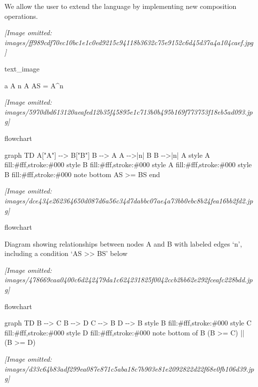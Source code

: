 \documentclass[
]{article}
\newenvironment{Shaded}{}{}
\newcommand{\NormalTok}[1]{#1}
\begin{document}
We allow the user to extend the language by implementing new composition
operations.

\textit{[Image omitted: images/ff989cdf70ec10bc1e1c0ed9215c94118b3632c75e9152c6d45d37a4a104caef.jpg]}

text\_image

a A n A AS = A\^{}n

\textit{[Image omitted: images/5970dbd613120aeafed12b35f45895e1c713b0b495b169f773753f18eb5ad093.jpg]}

flowchart

\begin{Shaded}
\begin{Highlighting}[]
\NormalTok{graph TD}
\NormalTok{    A["A"] {-}{-}\textgreater{} B["B"]}
\NormalTok{    B {-}{-}\textgreater{} A}
\NormalTok{    A {-}{-}\textgreater{}|n| B}
\NormalTok{    B {-}{-}\textgreater{}|n| A}
\NormalTok{    style A fill:\#fff,stroke:\#000}
\NormalTok{    style B fill:\#fff,stroke:\#000}
\NormalTok{    style A fill:\#fff,stroke:\#000}
\NormalTok{    style B fill:\#fff,stroke:\#000}
\NormalTok{    note bottom}
\NormalTok{        AS \textgreater{}= BS}
\NormalTok{    end}
\end{Highlighting}
\end{Shaded}

\textit{[Image omitted: images/dce434e262364650d087d6a56c34d7dabbc07ae4a73bb0ebc8b24fea16bb2fd2.jpg]}

flowchart

Diagram showing relationships between nodes A and B with labeled edges
`n', including a condition `AS \textgreater\textgreater{} BS' below

\textit{[Image omitted: images/478669caa0400c6d242479da1c624231825f0042ccb2bb62e292fceafc228bdd.jpg]}

flowchart

\begin{Shaded}
\begin{Highlighting}[]
\NormalTok{graph TD}
\NormalTok{    B {-}{-}\textgreater{} C}
\NormalTok{    B {-}{-}\textgreater{} D}
\NormalTok{    C {-}{-}\textgreater{} B}
\NormalTok{    D {-}{-}\textgreater{} B}
\NormalTok{    style B fill:\#fff,stroke:\#000}
\NormalTok{    style C fill:\#fff,stroke:\#000}
\NormalTok{    style D fill:\#fff,stroke:\#000}
\NormalTok{    note bottom of B (B \textgreater{}= C) || (B \textgreater{}= D)}
\end{Highlighting}
\end{Shaded}

\textit{[Image omitted: images/d33c64b83adf299ea087e871c5aba18c7b903e81e2092822d22f68e0fb106d39.jpg]}
\end{document}
